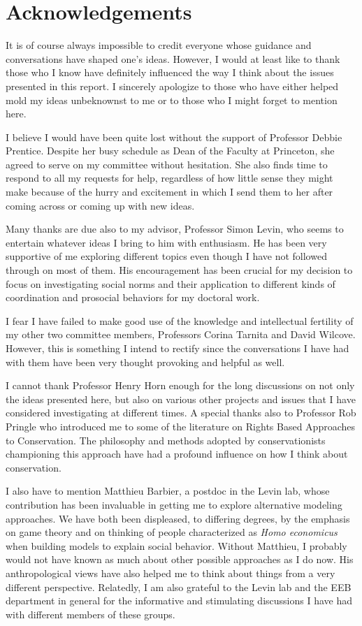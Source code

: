 \documentclass{report}
\begin{document}
\chapter*{Acknowledgements}

It is of course always impossible to credit everyone whose guidance and conversations have shaped one's ideas. However, I would at least like to thank those who I know have definitely influenced the way I think about the issues presented in this report. I sincerely apologize to those who have either helped mold my ideas unbeknownst to me or to those who I might forget to mention here.

I believe I would have been quite lost without the support of Professor Debbie Prentice. Despite her busy schedule as Dean of the Faculty at Princeton, she agreed to serve on my committee without hesitation. She also finds time to respond to all my requests for help, regardless of how little sense they might make because of the hurry and excitement in which I send them to her after coming across or coming up with new ideas.

Many thanks are due also to my advisor, Professor Simon Levin, who seems to entertain whatever ideas I bring to him with enthusiasm. He  has been very supportive of me exploring different topics even though I have not followed through on most of them. His encouragement has been crucial for my decision to focus on investigating social norms and their application to different kinds of coordination and prosocial behaviors for my doctoral work.

I fear I have failed to make good use of the knowledge and intellectual fertility of my other two committee members, Professors Corina Tarnita and David Wilcove. However, this is something I intend to rectify since the conversations I have had with them have been very thought provoking and helpful as well.

I cannot thank Professor Henry Horn enough for the long discussions on not only the ideas presented here, but also on various other projects and issues that I have considered investigating at different times. A special thanks also to Professor Rob Pringle who introduced me to some of the literature on Rights Based Approaches to Conservation. The philosophy and methods adopted by conservationists championing this approach have had a profound influence on how I think about conservation.

I also have to mention Matthieu Barbier, a postdoc in the Levin lab, whose contribution has been invaluable in getting me to explore alternative modeling approaches. We have both been displeased, to differing degrees, by the emphasis on game theory and on thinking of people characterized as \textit{Homo economicus} when building models to explain social behavior. Without Matthieu, I probably would not have known as much about other possible approaches as I do now. His anthropological views have also helped me to think about things from a very different perspective. Relatedly, I am also grateful to the Levin lab and the EEB department in general for the informative and stimulating discussions I have had with different members of these groups.
\end{document}
